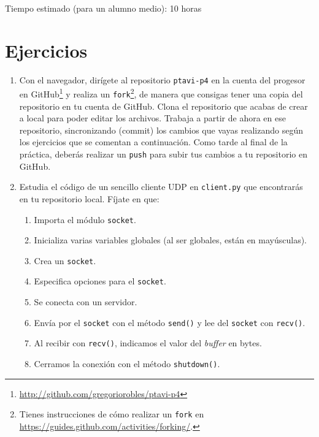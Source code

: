 \documentclass[11pt,a4paper]{article}
\begin{document}
Tiempo estimado (para un alumno medio): 10 horas

\section{Ejercicios}

\begin{enumerate}

  \item Con el navegador, dirígete al repositorio \texttt{ptavi-p4} en la cuenta del progesor en GitHub\footnote{\url{http://github.com/gregoriorobles/ptavi-p4}} y realiza un \texttt{fork}\footnote{Tienes instrucciones de cómo realizar un \texttt{fork} en \url{https://guides.github.com/activities/forking/}.}, de manera que consigas tener una copia del repositorio en tu cuenta de GitHub. Clona el repositorio que acabas de crear a local para poder editar los archivos. Trabaja a partir de ahora en ese repositorio, sincronizando (commit) los cambios que vayas realizando según los ejercicios que se comentan a continuación. Como tarde al final de la práctica, deberás realizar un \texttt{push} para subir tus cambios a tu repositorio en GitHub.

  \item Estudia el código de un sencillo cliente UDP en \texttt{client.py} que encontrarás en tu repositorio local. Fíjate en que:
  \begin{enumerate}
    \item Importa el módulo \texttt{socket}.
    \item Inicializa varias variables globales (al ser globales, están en mayúsculas).
    \item Crea un \texttt{socket}.
    \item Especifica opciones para el \texttt{socket}.
    \item Se conecta con un servidor.
    \item Envía por el \texttt{socket} con el método \texttt{send()} y lee del \texttt{socket} con \texttt{recv()}.
    \item Al recibir con \texttt{recv()}, indicamos el valor del \emph{buffer} en bytes.
    \item Cerramos la conexión con el método \texttt{shutdown()}.
  \end{enumerate}



\end{enumerate}
\end{document}

